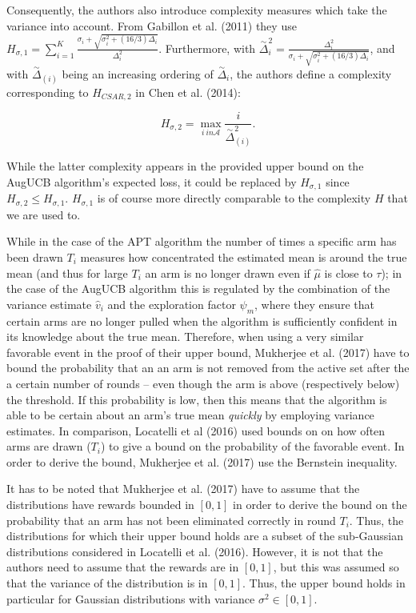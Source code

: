 \documentclass[12pt,]{article}
\begin{document}
Consequently, the authors also introduce complexity measures which take
the variance into account. From Gabillon et al. (2011) they use
\(H_{\sigma, 1}= \sum_{i=1}^K \frac{\sigma_i + \sqrt{\sigma_i^2 + (16/3)\Delta_i}}{\Delta_i^2}\).
Furthermore, with
\(\stackrel{\sim}{\Delta}_i^2 = \frac{\Delta_i^2}{\sigma_i + \sqrt{\sigma_i^2 + (16/3)\Delta_i}}\),
and with \(\stackrel{\sim}{\Delta}_{(i)}\) being an increasing ordering
of \(\stackrel{\sim}{\Delta}_i\), the authors define a complexity
corresponding to \(H_{CSAR,2}\) in Chen et al. (2014):

\begin{equation*}
H_{\sigma,2} = \max_{i \ in \mathcal{A}} \frac{i}{\stackrel{\sim}{\Delta}_{(i)}^2}.
\end{equation*}

While the latter complexity appears in the provided upper bound on the
AugUCB algorithm's expected loss, it could be replaced by
\(H_{\sigma, 1}\) since \(H_{\sigma, 2} \leq H_{\sigma,1}\).
\(H_{\sigma,1}\) is of course more directly comparable to the complexity
\(H\) that we are used to.

While in the case of the APT algorithm the number of times a specific
arm has been drawn \(T_i\) measures how concentrated the estimated mean
is around the true mean (and thus for large \(T_i\) an arm is no longer
drawn even if \(\hat{\mu}\) is close to \(\tau\)); in the case of the
AugUCB algorithm this is regulated by the combination of the variance
estimate \(\hat{v}_i\) and the exploration factor \(\psi_m\), where they
ensure that certain arms are no longer pulled when the algorithm is
sufficiently confident in its knowledge about the true mean. Therefore,
when using a very similar favorable event in the proof of their upper
bound, Mukherjee et al. (2017) have to bound the probability that an an
arm is not removed from the active set after the a certain number of
rounds -- even though the arm is above (respectively below) the
threshold. If this probability is low, then this means that the
algorithm is able to be certain about an arm's true mean \emph{quickly}
by employing variance estimates. In comparison, Locatelli et al (2016)
used bounds on on how often arms are drawn (\(T_i\)) to give a bound on
the probability of the favorable event. In order to derive the bound,
Mukherjee et al. (2017) use the Bernstein inequality.

It has to be noted that Mukherjee et al. (2017) have to assume that the
distributions have rewards bounded in \([0,1]\) in order to derive the
bound on the probability that an arm has not been eliminated correctly
in round \(T_i\). Thus, the distributions for which their upper bound
holds are a subset of the sub-Gaussian distributions considered in
Locatelli et al. (2016). However, it is not that the authors need to
assume that the rewards are in \([0,1]\), but this was assumed so that
the variance of the distribution is in \([0,1]\). Thus, the upper bound
holds in particular for Gaussian distributions with variance
\(\sigma^2 \in [0,1]\).
\end{document}

